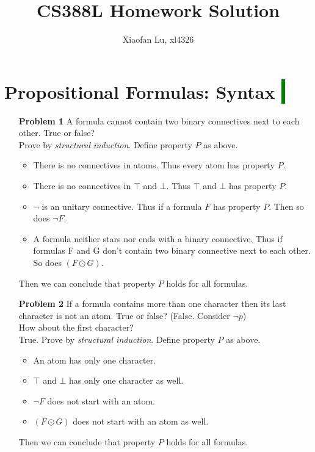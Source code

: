 \documentclass[12pt]{article}
\begin{document}
\title{CS388L Homework Solution}
\author{Xiaofan Lu, xl4326}
\date{\vspace{-3ex}}
\maketitle

\section*{Propositional Formulas: Syntax  \colorbox{green}{$~$ }}
\begin{enumerate}
\item[\textbf{Problem 1}] A formula cannot contain two binary connectives next to each other. True or false?\\
Prove by \textit{structural induction}. Define property $P$ as above. 
\begin{itemize}
\item There is no connectives in atoms. Thus every atom has property $P$. 
\item There is no connectives in $\top$ and $\bot$. Thus $\top$ and $\bot$ has property $P$. 
\item $\neg$ is an unitary connective. Thus if a formula $F$ has property $P$. Then so does $\neg F$. 
\item A formula neither stars nor ends with a binary connective. Thus if formulas F and G don't contain two binary connective next to each other. So does $(F \odot G)$. 
\end{itemize}
\noindent Then we can conclude that property $P$ holds for all formulas. 

\item[\textbf{Problem 2}] If a formula contains more than one character then its last character is not an atom. True or false?     (False. Consider $\neg p$)  \\
How about the first character? \\
True. Prove by \textit{structural induction}. Define property $P$ as above. 
\begin{itemize}
\item An atom has only one character. 
\item $\top$ and $\bot$ has only one character as well. 
\item $\neg F$ does not start with an atom. 
\item $(F \odot G)$ does not start with an atom as well.   
\end{itemize}
\noindent Then we can conclude that property $P$ holds for all formulas. 
\end{enumerate}
\end{document}
